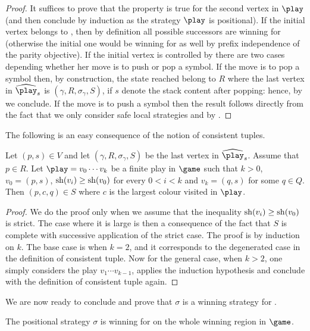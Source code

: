 \begin{proof}
	It suffices to prove that the property is true for the second vertex in $\play$ (and then conclude by induction as the strategy $\play$ is positional). If the initial vertex belongs to \Adam, then by definition all possible successors are winning for \Eve (otherwise the initial one would be winning for \Adam as well by prefix independence of the parity objective). If the initial vertex is controlled by \Eve there are two cases depending whether her move is to push or pop a symbol. If the move is to pop a symbol then, by construction, the state reached belong to $R$ where the last vertex in $\hplay_s$ is $(\gamma,R,\sigma_\gamma,S)$, if $s$ denote the stack content after popping: hence, by  we conclude. If the move is to push a symbol then the result follows directly from the fact that we only consider safe local strategies and by .
\end{proof}

The following is an easy consequence of the notion of consistent tuples.

\begin{proposition}\label{10-proposition:bumps}
Let $(p,s)\in V$ and let $(\gamma,R,\sigma_\gamma,S)$ be the last vertex in $\hplay_s$. Assume that $p\in R$. Let $\play=v_0\cdots v_k$ be a finite play in $\game$ such that $k> 0$, $v_0=(p,s)$, $\mathrm{sh}(v_i)\geq\mathrm{sh}(v_0)$ for every $0< i< k$ and $v_k=(q,s)$ for some $q\in Q$. Then $(p,c,q)\in S$ where $c$ is the largest colour visited in $\play$. 
\end{proposition}

\begin{proof}
	We do the proof only when we assume that the inequality $\mathrm{sh}(v_i)\geq\mathrm{sh}(v_0)$ is strict. The case where it is large is then a consequence of the fact that $S$ is complete with successive application of the strict case.
	The proof is by induction on $k$. The base case is when $k=2$, and it corresponds to the degenerated case in the definition of consistent tuple. Now for the general case, when $k>2$, one simply considers the play $v_1\cdots v_{k-1}$, applies the induction hypothesis and conclude with the definition of consistent tuple again.
\end{proof}

We are now ready to conclude and prove that $\sigma$ is a winning strategy for \Eve.

\begin{theorem}\label{10-thm:positional-strategy}
	The positional strategy $\sigma$ is winning for \Eve on the whole winning region in $\game$.
\end{theorem}


